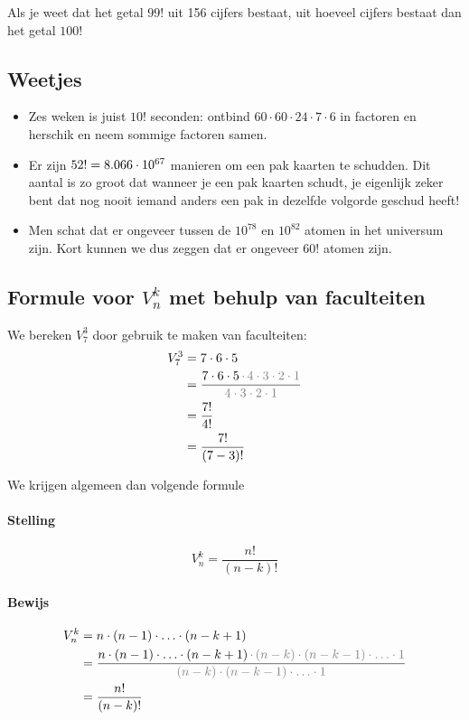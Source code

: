 \documentclass[12pt,a4,twoside]{article}
\begin{document}
\begin{oefening}
Als je weet dat het getal $99!$ uit 156 cijfers bestaat, uit hoeveel cijfers bestaat dan het getal $100!$
\end{oefening}

\subsection*{Weetjes}
\begin{itemize}
  \item Zes weken is juist $10!$ seconden: ontbind $60\cdot 60\cdot 24\cdot 7\cdot 6$ in factoren en herschik en neem sommige factoren samen.
  \item Er zijn $52!=8.066\cdot 10^{67}$ manieren om een pak kaarten te schudden. Dit aantal is zo groot dat wanneer je een pak kaarten schudt, je eigenlijk zeker bent dat nog nooit iemand anders een pak in dezelfde volgorde geschud heeft!
  \item Men schat dat er ongeveer tussen de $10^{78}$ en $10^{82}$ atomen in het universum zijn. Kort kunnen we dus zeggen dat er ongeveer $60!$ atomen zijn.
\end{itemize}

\subsection{Formule voor $V^k_n$ met behulp van faculteiten}

We bereken $V^3_7$ door gebruik te maken van faculteiten:
\begin{align*}
  V^3_7 &= 7 \cdot 6 \cdot 5\\
        &= \dfrac{7 \cdot 6 \cdot 5 \, \color{gray}{ \cdot \, 4 \cdot 3 \cdot 2 \cdot 1}}{\color{gray}{4 \cdot 3 \cdot 2 \cdot 1}}\\
        &= \dfrac{7!}{4!}\\
        &= \dfrac{7!}{(7-3)!}\\
\end{align*}

We krijgen algemeen dan volgende formule

\paragraph*{Stelling}
\begin{mdframed}
$$V^k_n=\dfrac{n!}{(n-k)!}$$
\end{mdframed}

\paragraph*{Bewijs}
\begin{align*}
  V^k_n &= n \cdot (n-1) \cdot \ldots \cdot (n-k+1)\\
        &= \dfrac{n \cdot (n-1) \cdot \ldots \cdot (n-k+1) \, \color{gray}{ \cdot \, (n-k) \cdot (n-k-1) \cdot \ldots \cdot 1}}{\color{gray}{(n-k) \cdot (n-k-1) \cdot \ldots \cdot 1}}\\
        &= \dfrac{n!}{(n-k)!}\\
\end{align*}
\end{document}
